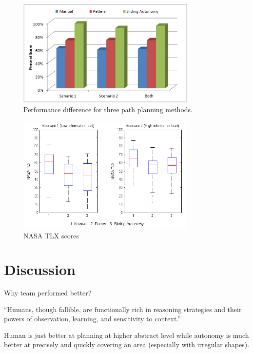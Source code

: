 \documentclass[journal]{IEEEtran}
\begin{document}
\begin{figure}
\centering
\includegraphics[width=3.5in]{PerformanceDifference.JPG}
\caption{Performance difference for three path planning methods.}
\label{PerformanceDifference}
\end{figure}



\begin{figure}
\centering
\includegraphics[width=3.5in]{NASATLXBoxPlot.JPG}
\caption{NASA TLX scores}
\label{NASATLX}
\end{figure}




\section{Discussion} 
\label{sec:Discussion}

Why team performed better?

``Humans, though fallible, are functionally rich in reasoning strategies and their powers of observation, learning, and sensitivity to context.'' ~\cite{Bradshaw2013Seven}

Human is just better at planning at higher abstract level while autonomy is much better at precisely and quickly covering an area (especially with irregular shapes).
\end{document}

